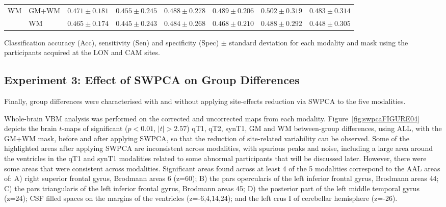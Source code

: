 \begin{bigtable}
\begin{tabularx}{\linewidth}{ll|XXX|XXX}
		\midrule
		\multirow{2}{*}{\ac{WM}} &GM+WM &		$ 0.471 \pm 0.181 $ & $ 0.455 \pm 0.245 $ & $ 0.488 \pm 0.278 $ & $ 0.489 \pm 0.206 $ & $ 0.502 \pm 0.319 $ &  $ 0.483 \pm 0.314 $ \\
		&		WM &		$ 0.465 \pm 0.174 $ & $ 0.445 \pm 0.243 $ & $ 0.484 \pm 0.268 $ & $ 0.468 \pm 0.210 $ & $ 0.488 \pm 0.292 $ &  $ 0.448 \pm 0.305 $ \\
		\bottomrule
	\end{tabularx}
	\caption[Classification accuracy (Acc), sensitivity (Sen) and specificity (Spec) $\pm$ standard deviation for each modality and mask using the participants acquired at the LON and CAM sites.]{Classification accuracy (Acc), sensitivity (Sen) and specificity (Spec) $\pm$ standard deviation for each modality and mask using the participants acquired at the LON and CAM sites.}
	\label{tab:swpcaLONCAM}
\end{bigtable}



\subsection{Experiment 3: Effect of \acs{SWPCA} on Group Differences}\label{sec:swpcaE3}
Finally, group differences were characterised with and without applying site-effects reduction via \ac{SWPCA} to the five modalities. 

Whole-brain \ac{VBM} analysis was performed on the corrected and uncorrected maps from each modality. Figure~\ref{fig:swpcaFIGURE04} depicts the brain $t$-maps of significant ($p<0.01$, $|t|>2.57$) \ac{qT1}, \ac{qT2}, \ac{synT1}, \ac{GM} and \ac{WM} between-group differences, using ALL, with the GM+WM mask, before and after applying \ac{SWPCA}, so that the reduction of site-related variability can be observed. Some of the highlighted areas after applying \ac{SWPCA} are inconsistent across modalities, with spurious peaks and noise, including a large area around the ventricles in the \ac{qT1} and \ac{synT1} modalities related to some abnormal participants that will be discussed later. However, there were some areas that were consistent across modalities. Significant areas found across at least 4 of the 5 modalities correspond to the \ac{AAL} \cite{Tzourio-Mazoyer2002} areas of: A) right superior frontal gyrus, Brodmann areas 6 (z=60); B) the pars opercularis of the left inferior frontal gyrus, Brodmann areas 44; C) the pars triangularis of the left inferior frontal gyrus, Brodmann areas 45; D) the posterior part of the left middle temporal gyrus (z=24); \ac{CSF} filled spaces on the margins of the ventricles (z=-6,4,14,24); and the left crus I of cerebellar hemisphere (z=-26).

